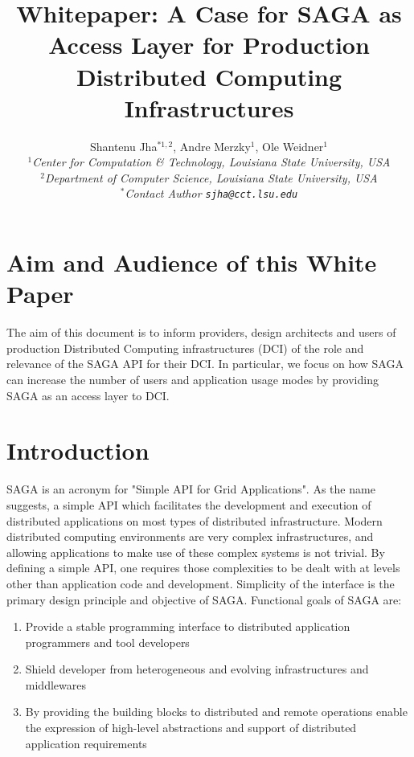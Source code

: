 \documentclass[12pt]{article}
\begin{document}
\title{Whitepaper: A Case for SAGA as Access Layer for Production
  Distributed Computing Infrastructures}

\author{Shantenu Jha$^{*1,2}$, Andre Merzky$^{1}$, Ole Weidner$^{1}$\\
  \small{\emph{$^{1}$Center for Computation \& Technology, Louisiana State University, USA}}\\
  \small{\emph{$^{2}$Department of Computer Science, Louisiana State University, USA}}\\
  \small{\emph{$^{*}$Contact Author \texttt{sjha@cct.lsu.edu}}}
  }


\maketitle

\section*{Aim and Audience of this White Paper}
The aim of this document is to inform providers, design architects and
users of production Distributed Computing infrastructures (DCI) of the
role and relevance of the SAGA API for their DCI. In particular, we
focus on how SAGA can increase the number of users and application
usage modes by providing SAGA as an access layer to DCI.




\section{Introduction}

SAGA is an acronym for "Simple API for Grid Applications". As the name
suggests, a simple API which facilitates the development and execution
of distributed applications on most types of distributed
infrastructure.  Modern distributed computing environments are very
complex infrastructures, and allowing applications to make use of
these complex systems is not trivial.  By defining a simple API, one
requires those complexities to be dealt with at levels other than
application code and development.  Simplicity of the interface is the
primary design principle and objective of SAGA.  Functional goals of
SAGA are:

\begin{enumerate}

\item Provide a stable programming interface to distributed
   application programmers and tool developers
 
\item Shield developer from heterogeneous and evolving
   infrastructures and middlewares

\item By providing the building blocks to distributed and remote
   operations enable the expression of high-level abstractions
   and support of distributed application requirements

\end{enumerate}
\end{document}
